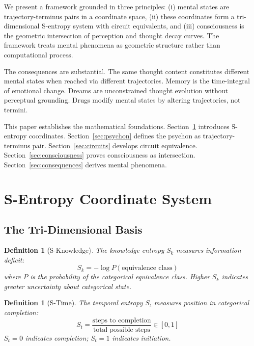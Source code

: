 \documentclass[twocolumn,amsmath,amssymb,aps,prl,superscriptaddress]{revtex4-2}
\newtheorem{definition}[theorem]{Definition}
\newcommand{\Sk}{S_k}
\newcommand{\St}{S_t}
\begin{document}
We present a framework grounded in three principles: (i) mental states are trajectory-terminus pairs in a coordinate space, (ii) these coordinates form a tri-dimensional S-entropy system with circuit equivalents, and (iii) consciousness is the geometric intersection of perception and thought decay curves. The framework treats mental phenomena as geometric structure rather than computational process.

The consequences are substantial. The same thought content constitutes different mental states when reached via different trajectories. Memory is the time-integral of emotional change. Dreams are unconstrained thought evolution without perceptual grounding. Drugs modify mental states by altering trajectories, not termini.

This paper establishes the mathematical foundations. Section~\ref{sec:sentropy} introduces S-entropy coordinates. Section~\ref{sec:psychon} defines the psychon as trajectory-terminus pair. Section~\ref{sec:circuits} develops circuit equivalence. Section~\ref{sec:consciousness} proves consciousness as intersection. Section~\ref{sec:consequences} derives mental phenomena.

\section{S-Entropy Coordinate System}
\label{sec:sentropy}

\subsection{The Tri-Dimensional Basis}

\begin{definition}[S-Knowledge]
\label{def:sk}
The knowledge entropy $\Sk$ measures information deficit:
\begin{equation}
\boxed{\Sk = -\log P(\text{equivalence class})}
\end{equation}
where $P$ is the probability of the categorical equivalence class. Higher $\Sk$ indicates greater uncertainty about categorical state.
\end{definition}

\begin{definition}[S-Time]
\label{def:st}
The temporal entropy $\St$ measures position in categorical completion:
\begin{equation}
\boxed{\St = \frac{\text{steps to completion}}{\text{total possible steps}} \in [0, 1]}
\end{equation}
$\St = 0$ indicates completion; $\St = 1$ indicates initiation.
\end{definition}
\end{document}
